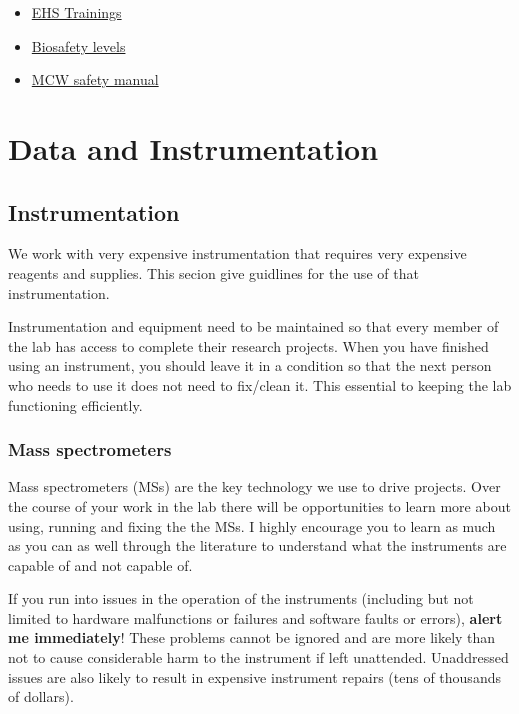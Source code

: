 \documentclass[
]{book}
\providecommand{\tightlist}{%
  \setlength{\itemsep}{0pt}\setlength{\parskip}{0pt}}
\begin{document}
\begin{itemize}
\tightlist
\item
  \href{https://www.mcw.edu/departments/research-systems/training/safety}{EHS Trainings}
\item
  \href{https://www.mcw.edu/departments/institutional-biosafety-committee-ibc/biosafety-levels}{Biosafety levels}
\item
  \href{https://infoscope.mcw.edu/FileLibrary/Groups/InfoScopeSafety/Manuals/SafetyManual_2017.pdf}{MCW safety manual}
\end{itemize}

\hypertarget{data}{%
\chapter{Data and Instrumentation}\label{data}}

\hypertarget{instrumentation}{%
\section{Instrumentation}\label{instrumentation}}

We work with very expensive instrumentation that requires very expensive reagents and supplies. This secion give guidlines for the use of that instrumentation.

Instrumentation and equipment need to be maintained so that every member of the lab has access to complete their research projects. When you have finished using an instrument, you should leave it in a condition so that the next person who needs to use it does not need to fix/clean it. This essential to keeping the lab functioning efficiently.

\hypertarget{mass-spectrometers}{%
\subsection{Mass spectrometers}\label{mass-spectrometers}}

Mass spectrometers (MSs) are the key technology we use to drive projects. Over the course of your work in the lab there will be opportunities to learn more about using, running and fixing the the MSs. I highly encourage you to learn as much as you can as well through the literature to understand what the instruments are capable of and not capable of.

If you run into issues in the operation of the instruments (including but not limited to hardware malfunctions or failures and software faults or errors), \textbf{alert me immediately}! These problems cannot be ignored and are more likely than not to cause considerable harm to the instrument if left unattended. Unaddressed issues are also likely to result in expensive instrument repairs (tens of thousands of dollars).
\end{document}
